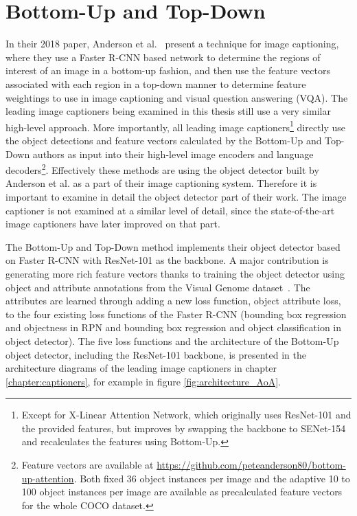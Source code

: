 \documentclass[english,twoside,openright]{HYgraduMLDS}
\begin{document}
\section{Bottom-Up and Top-Down}
In their 2018 paper, Anderson et al.~\cite{BottomUp} present a technique for image captioning, where they use a Faster R-CNN based network to determine the regions of interest of an image in a bottom-up fashion, and then use the feature vectors associated with each region in a top-down manner to determine feature weightings to use in image captioning and visual question answering (VQA). The leading image captioners being examined in this thesis still use a very similar high-level approach. More importantly, all leading image captioners\footnote{Except for X-Linear Attention Network, which originally uses ResNet-101 and the provided features, but improves by swapping the backbone to SENet-154 and recalculates the features using Bottom-Up.} directly use the object detections and feature vectors calculated by the Bottom-Up and Top-Down authors as input into their high-level image encoders and language decoders\footnote{Feature vectors are available at \url{https://github.com/peteanderson80/bottom-up-attention}. Both fixed 36 object instances per image and the adaptive 10 to 100 object instances per image are available as precalculated feature vectors for the whole COCO dataset.}. Effectively these methods are using the object detector built by Anderson et al. as a part of their image captioning system. Therefore it is important to examine in detail the object detector part of their work. The image captioner is not examined at a similar level of detail, since the state-of-the-art image captioners have later improved on that part.

The Bottom-Up and Top-Down method implements their object detector based on Faster R-CNN with ResNet-101 as the backbone. A major contribution is generating more rich feature vectors thanks to training the object detector using object and attribute annotations from the Visual Genome dataset~\cite{VisualGenome}. The attributes are learned through adding a new loss function, object attribute loss, to the four existing loss functions of the Faster R-CNN (bounding box regression and objectness in RPN and bounding box regression and object classification in object detector). The five loss functions and the architecture of the Bottom-Up object detector, including the ResNet-101 backbone, is presented in the architecture diagrams of the leading image captioners in chapter \ref{chapter:captioners}, for example in figure \ref{fig:architecture_AoA}. 
\end{document}
